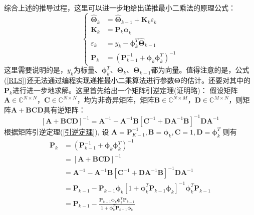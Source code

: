 综合上述的推导过程，这里可以进一步地给出递推最小二乘法的原理公式：
\begin{equation}
\label{RLS}
\left\{
\begin{aligned}
\hat{\symbf{\Theta}}_{k}&=\hat{\symbf{\Theta}}_{k-1}+\symbf{K}_{k} \varepsilon_{k}\\
\symbf{K}_{k}&=\symbf{P}_{k} \symbf{\phi}_{k}\\
\varepsilon_{k}&={y_{k}}-{\symbf{\phi}_{k}^{T} \hat{\symbf{\Theta}}_{k-1}}\\
\symbf{P}_{k}&=\left(\symbf{P}_{k-1}^{-1}+\symbf{\phi}_{k} \symbf{\phi}_{k}^{T}\right)^{-1}
\end{aligned}
\right.
\end{equation}
这里需要说明的是，$y_k$为标量、$\symbf{\phi}_{k}^{T}$、$\symbf{\Theta}_k$、$\symbf{\Theta}_{k-1}$都为向量。值得注意的是，公式(\ref{RLS})还无法通过编程实现递推最小二乘算法进行参数$\symbf{\Theta}$的估计。还要对其中的$\symbf{P}_k$进行进一步地求解。这里首先给出一个矩阵引逆定理(证明略)：
假设矩阵$\symbf{A}\in \mathbb{C}^{N\times N}$，$\symbf{C}\in\mathbb{C}^{N\times N}$，均为非奇异矩阵，矩阵$\symbf{B}\in\mathbb{C}^{N\times M}$，$\symbf{D}\in\mathbb{C}^{M\times N}$，则矩阵$\symbf{A}+\symbf{BCD}$具有逆矩阵：
\begin{equation}
\label{引逆定理}
[\symbf{A}+\symbf{B C D}]^{-1}=\symbf{A}^{-1}-\symbf{A}^{-1} \symbf{B}\left[\symbf{C}^{-1}+\symbf{D} \symbf{A}^{-1} \symbf{B}\right]^{-1} \symbf{D} \symbf{A}^{-1}
\end{equation}
根据矩阵引逆定理(\ref{引逆定理}),
设 $\symbf{A}=\symbf{P}_{K-1}^{-1}, \symbf{B}=\symbf{\phi}_{k}, \symbf{C}=1, \symbf{D}=\symbf{\phi}_{k}^{T}$
则有
\begin{equation}
\label{逆}
\begin{aligned}
\symbf{P}_{k}&=\left(\symbf{P}_{k-1}^{-1}+\symbf{\phi}_{k} \symbf{\phi}_{k}^{T}\right)^{-1}\\
&=[\symbf{A}+\symbf{B C D}]^{-1}\\
&=\symbf{A}^{-1}-\symbf{A}^{-1} \symbf{B}\left[\symbf{C}^{-1}+\symbf{D} \symbf{A}^{-1} \symbf{B}\right]^{-1} \symbf{D} \symbf{A}^{-1}\\
&=\symbf{P}_{k-1}-\symbf{P}_{k-1} \symbf{\phi}_{k}\left[1+\symbf{\phi}_{k}^{T} \symbf{P}_{k-1} \symbf{\phi}_{k}\right]^{-1} \symbf{\phi}_{k}^{T} \symbf{P}_{k-1}\\
&=\symbf{P}_{k-1}-\frac{\symbf{P}_{k-1} \symbf{\phi}_{k} \symbf{\phi}_{k}^{T} \symbf{P}_{k-1}}{1+\symbf{\phi}_{k}^{T} \symbf{P}_{k-1} \symbf{\phi}_{k}}
\end{aligned}
\end{equation}

